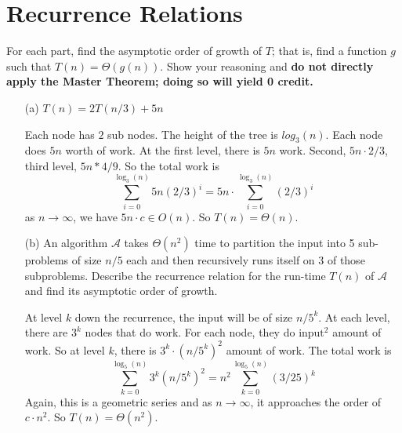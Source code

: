 \documentclass{article}
\begin{document}
\newpage
\section*{Recurrence Relations}
    For each part, find the asymptotic order of growth of $T$; that is, find a function $g$ such that $T (n) = \Theta(g(n))$. Show your reasoning and \textbf{do not directly apply the Master Theorem; doing so will yield 0 credit.}
        \begin{itemize}
            \item [(a)] $T(n) = 2T(n / 3) + 5n$
                \begin{answer}
                    Each node has $2$ sub nodes. The height of the tree is $log_3(n)$. Each node does $5n$ worth of work. At the first level, there is $5n$ work. Second, $5n \cdot 2 / 3$, third level, $5n * 4 / 9$. So the total work is 
                        \begin{equation*}
                            \sum_{i = 0}^{\log_3(n)} 5n (2 / 3)^{i} = 5n \cdot \sum_{i = 0}^{\log_3(n)} (2 / 3)^{i}
                        \end{equation*}
                    as $n \rightarrow \infty$, we have $5n \cdot c \in O(n)$. So $T(n) = \Theta(n)$.
                \end{answer}

            \item [(b)] An algorithm $\mathcal{A}$ takes $\Theta(n^{2})$ time to partition the input into 5 sub-problems of size $n/5$ each and then recursively runs itself on 3 of those subproblems. Describe the recurrence relation for the run-time $T (n)$ of $\mathcal{A}$ and find its asymptotic order of growth.
                \begin{answer}
                    At level $k$ down the recurrence, the input will be of size $n / 5^{k}$. At each level, there are $3^{k}$ nodes that do work. For each node, they do $\text{input}^{2}$ amount of work. So at level $k$, there is $3^{k} \cdot (n / 5^{k})^{2}$ amount of work. The total work is 
                        \begin{equation*}
                            \sum_{k = 0}^{\log_5(n)} 3^{k} (n / 5^{k})^{2} = n^{2} \sum_{k = 0}^{\log_5(n)} (3 / 25)^{k}
                        \end{equation*}
                    Again, this is a geometric series and as $n \rightarrow \infty$, it approaches the order of $c \cdot n^{2}$. So $T(n) = \Theta(n^{2})$.
                \end{answer}


\end{itemize}
\end{document}
